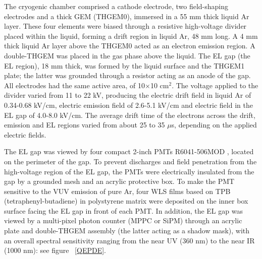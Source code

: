 \documentclass[a4paper,11pt]{article}
\begin{document}
The cryogenic chamber comprised a cathode electrode, two field-shaping electrodes and a thick GEM (THGEM0), immersed in a 55 mm thick liquid Ar layer. These four elements were biased through a resistive high-voltage divider placed within the liquid, forming a drift region in liquid Ar, 48 mm long. A 4 mm thick liquid Ar layer above the THGEM0 acted as an electron emission region. A double-THGEM was placed in the gas phase above the liquid. The EL gap (the EL region), 18 mm thick, was formed by the liquid surface and the THGEM1 plate; the latter was grounded through a resistor acting as an anode of the gap. All electrodes had the same active area, of 10$\times$10 cm$^2$. The voltage applied to the divider varied from 11 to 22 kV, producing the electric drift field in liquid Ar of 0.34-0.68 kV/cm, electric emission field of 2.6-5.1 kV/cm and electric field in the EL gap of 4.0-8.0 kV/cm. The average drift time of the electrons across the drift, emission and EL regions varied from about 25 to 35 $\mu$s, depending on the applied electric fields.

The EL gap was viewed by four compact 2-inch PMTs R6041-506MOD \cite{CryoPMT15,CryoPMT17}, located on the perimeter of the gap. To prevent discharges and field penetration from the high-voltage region of the EL gap, the PMTs were electrically insulated from the gap by a grounded mesh and an acrylic protective box. To make the PMT sensitive to the VUV emission of pure Ar, four WLS films based on TPB (tetraphenyl-butadiene) in polystyrene matrix  \cite{TPB2,TPB1} \fi \cite{TPB2,TPB1} were deposited on the inner box surface facing the EL gap in front of each PMT. In addition, the EL gap was viewed by a multi-pixel photon counter (MPPC or SiPM) through an acrylic plate and double-THGEM assembly (the latter acting as a shadow mask), with an overall spectral sensitivity ranging from the near UV (360 nm) to the near IR (1000 nm): see figure ~\ref{QEPDE}.
\end{document}
